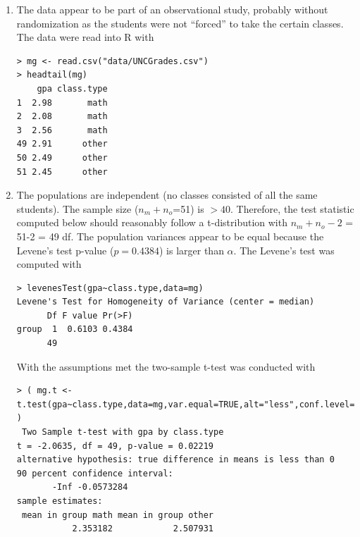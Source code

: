 \documentclass[10pt,openany]{book}\usepackage[]{graphicx}\usepackage[]{color}
\makeatletter
\newenvironment{kframe}{%
 \def\at@end@of@kframe{}%
 \ifinner\ifhmode%
  \def\at@end@of@kframe{\end{minipage}}%
  \begin{minipage}{\columnwidth}%
 \fi\fi%
 \def\FrameCommand##1{\hskip\@totalleftmargin \hskip-\fboxsep
 \colorbox{shadecolor}{##1}\hskip-\fboxsep
     \hskip-\linewidth \hskip-\@totalleftmargin \hskip\columnwidth}%
 \MakeFramed {\advance\hsize-\width
   \@totalleftmargin\z@ \linewidth\hsize
   \@setminipage}}%
 {\par\unskip\endMakeFramed%
 \at@end@of@kframe}
\newenvironment{knitrout}{}{} %
\makeatother
\begin{document}
\begin{itemize}
\begin{enumerate}
      \item The data appear to be part of an observational study, probably without randomization as the students were not ``forced'' to take the certain classes.  The data were read into R with
\begin{knitrout}
\color{fgcolor}\begin{kframe}
\begin{verbatim}
> mg <- read.csv("data/UNCGrades.csv")
> headtail(mg)
    gpa class.type
1  2.98       math
2  2.08       math
3  2.56       math
49 2.91      other
50 2.49      other
51 2.45      other
\end{verbatim}
\end{kframe}
\end{knitrout}
      \item The populations are independent (no classes consisted of all the same students).  The sample size ($n_{m}+n_{o}$=51) is $>40$.  Therefore, the test statistic computed below should reasonably follow a t-distribution with $n_{m}+n_{o}-2$ = 51-2 = 49 df.  The population variances appear to be equal because the Levene's test p-value ($p=0.4384$) is larger than $\alpha$.  The Levene's test was computed with
\begin{knitrout}
\color{fgcolor}\begin{kframe}
\begin{verbatim}
> levenesTest(gpa~class.type,data=mg)
Levene's Test for Homogeneity of Variance (center = median)
      Df F value Pr(>F)
group  1  0.6103 0.4384
      49               
\end{verbatim}
\end{kframe}
\end{knitrout}
With the assumptions met the two-sample t-test was conducted with
\begin{knitrout}
\color{fgcolor}\begin{kframe}
\begin{verbatim}
> ( mg.t <- t.test(gpa~class.type,data=mg,var.equal=TRUE,alt="less",conf.level=0.90) )
 Two Sample t-test with gpa by class.type 
t = -2.0635, df = 49, p-value = 0.02219
alternative hypothesis: true difference in means is less than 0 
90 percent confidence interval:
       -Inf -0.0573284 
sample estimates:
 mean in group math mean in group other 
           2.353182            2.507931 
\end{verbatim}
\end{kframe}

\end{knitrout}
\end{enumerate}
\end{itemize}
\end{document}
